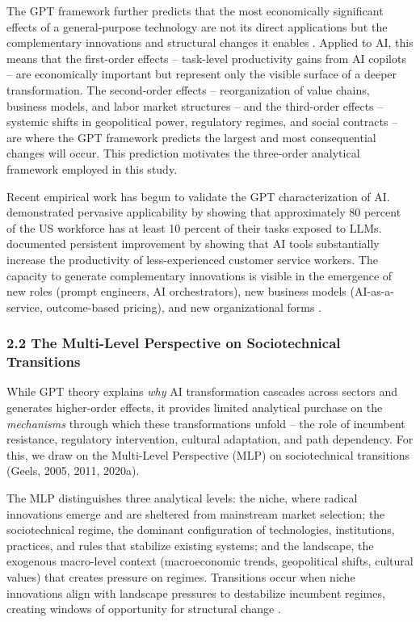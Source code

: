 \documentclass{article}
\begin{document}
The GPT framework further predicts that the most economically significant effects of a general-purpose technology are not its direct applications but the complementary innovations and structural changes it enables \citep{bresnahan1995gpt, korzinov2018gpt, coccia2018longwaves}. Applied to AI, this means that the first-order effects -- task-level productivity gains from AI copilots -- are economically important but represent only the visible surface of a deeper transformation. The second-order effects -- reorganization of value chains, business models, and labor market structures -- and the third-order effects -- systemic shifts in geopolitical power, regulatory regimes, and social contracts -- are where the GPT framework predicts the largest and most consequential changes will occur. This prediction motivates the three-order analytical framework employed in this study.

Recent empirical work has begun to validate the GPT characterization of AI. \citet{eloundou2023gpts} demonstrated pervasive applicability by showing that approximately 80 percent of the US workforce has at least 10 percent of their tasks exposed to LLMs. \citet{brynjolfsson2023generative} documented persistent improvement by showing that AI tools substantially increase the productivity of less-experienced customer service workers. The capacity to generate complementary innovations is visible in the emergence of new roles (prompt engineers, AI orchestrators), new business models (AI-as-a-service, outcome-based pricing), and new organizational forms \citep{kanbach2023genai, brown2024theory}.


\subsubsection{2.2 The Multi-Level Perspective on Sociotechnical Transitions}
\label{sec:2_2_the_multi_level_perspective_on_sociotechnical_transitions}

While GPT theory explains \textit{why} AI transformation cascades across sectors and generates higher-order effects, it provides limited analytical purchase on the \textit{mechanisms} through which these transformations unfold -- the role of incumbent resistance, regulatory intervention, cultural adaptation, and path dependency. For this, we draw on the Multi-Level Perspective (MLP) on sociotechnical transitions (Geels, 2005, 2011, 2020a).

The MLP distinguishes three analytical levels: the niche, where radical innovations emerge and are sheltered from mainstream market selection; the sociotechnical regime, the dominant configuration of technologies, institutions, practices, and rules that stabilize existing systems; and the landscape, the exogenous macro-level context (macroeconomic trends, geopolitical shifts, cultural values) that creates pressure on regimes. Transitions occur when niche innovations align with landscape pressures to destabilize incumbent regimes, creating windows of opportunity for structural change \citep{geels2011multilevel, roberts2019accelerated}.
\end{document}
